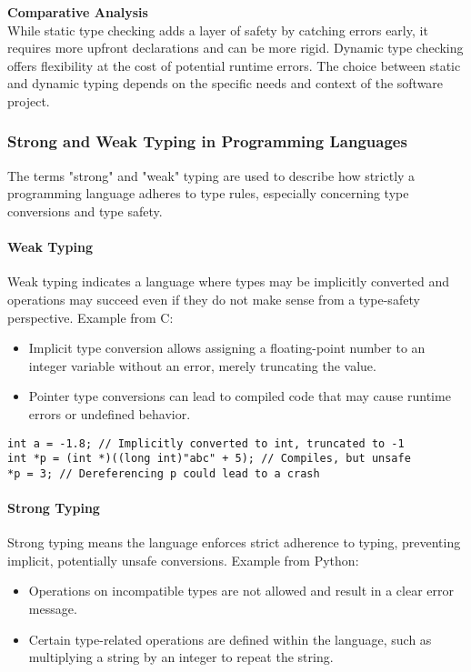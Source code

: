 \documentclass[12pt]{article}
\begin{document}
\textbf{Comparative Analysis}\\
While static type checking adds a layer of safety by catching errors early, it requires more upfront declarations and can be more rigid. Dynamic type checking offers flexibility at the cost of potential runtime errors. The choice between static and dynamic typing depends on the specific needs and context of the software project.


\subsubsection{Strong and Weak Typing in Programming Languages}

The terms "strong" and "weak" typing are used to describe how strictly a programming language adheres to type rules, especially concerning type conversions and type safety.

\paragraph{Weak Typing}

Weak typing indicates a language where types may be implicitly converted and operations may succeed even if they do not make sense from a type-safety perspective. Example from C:

\begin{itemize}
    \item Implicit type conversion allows assigning a floating-point number to an integer variable without an error, merely truncating the value.
    \item Pointer type conversions can lead to compiled code that may cause runtime errors or undefined behavior.
\end{itemize}

\begin{verbatim}
int a = -1.8; // Implicitly converted to int, truncated to -1
int *p = (int *)((long int)"abc" + 5); // Compiles, but unsafe
*p = 3; // Dereferencing p could lead to a crash
\end{verbatim}

\paragraph{Strong Typing}

Strong typing means the language enforces strict adherence to typing, preventing implicit, potentially unsafe conversions. Example from Python:

\begin{itemize}
    \item Operations on incompatible types are not allowed and result in a clear error message.
    \item Certain type-related operations are defined within the language, such as multiplying a string by an integer to repeat the string.
\end{itemize}
\end{document}
